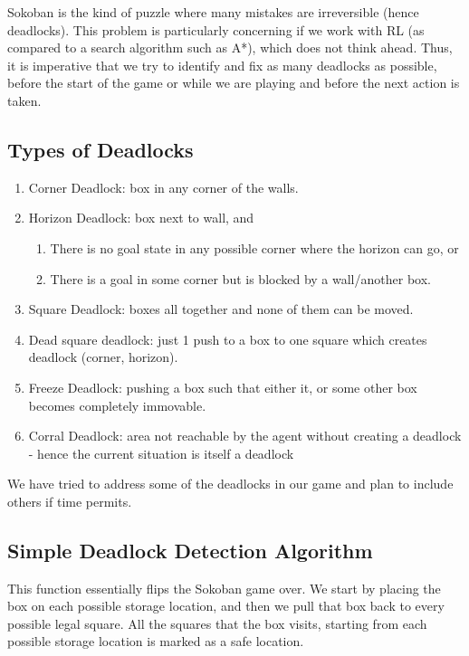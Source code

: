 \documentclass{article}
\begin{document}
Sokoban is the kind of puzzle where many mistakes are irreversible (hence deadlocks). This problem is particularly concerning if we work with RL (as compared to a search algorithm such as A*), which does not think ahead. Thus, it is imperative that we try to identify and fix as many deadlocks as possible, before the start of the game or while we are playing and before the next action is taken.  

\subsection{Types of Deadlocks}
\begin{enumerate}
    \item Corner Deadlock: box in any corner of the walls.
    \item Horizon Deadlock: box next to wall, and 
    \begin{enumerate}[label=\alph*)]
        \item There is no goal state in any possible corner where the horizon can go, or
        \item There is a goal in some corner but is blocked by a wall/another box.
    \end{enumerate}
    \item Square Deadlock: boxes all together and none of them can be moved.
    \item Dead square deadlock: just 1 push to a box to one square which creates deadlock (corner, horizon).
    \item Freeze Deadlock: pushing a box such that either it, or some other box becomes completely immovable.
    \item Corral Deadlock: area not reachable by the agent without creating a deadlock - hence the current situation is itself a deadlock
\end{enumerate}

We have tried to address some of the deadlocks in our game and plan to include others if time permits. 

\subsection{Simple Deadlock Detection Algorithm}
This function essentially flips the Sokoban game over. We start by placing the box on each possible storage location, and then we pull that box back to every possible legal square. All the squares that the box visits, starting from each possible storage location is marked as a safe location.
\end{document}

